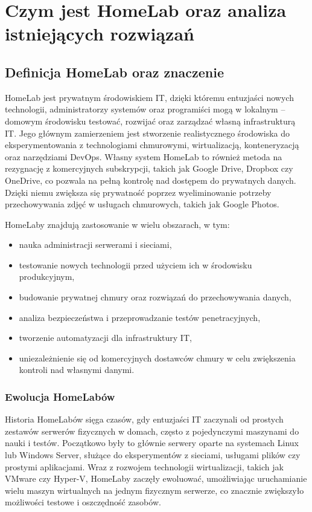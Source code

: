 \chapter{Czym jest HomeLab oraz analiza istniejących rozwiązań}

\section{Definicja HomeLab oraz znaczenie}
HomeLab jest prywatnym środowiskiem IT, dzięki któremu entuzjaści nowych technologii, administratorzy systemów oraz programiści mogą w lokalnym – domowym środowisku testować, rozwijać oraz zarządzać własną infrastrukturą IT. Jego głównym zamierzeniem jest stworzenie realistycznego środowiska do eksperymentowania z technologiami chmurowymi, wirtualizacją, konteneryzacją oraz narzędziami DevOps. Własny system HomeLab to również metoda na rezygnację z komercyjnych subskrypcji, takich jak Google Drive, Dropbox czy OneDrive, co pozwala na pełną kontrolę nad dostępem do prywatnych danych. Dzięki niemu zwiększa się prywatność poprzez wyeliminowanie potrzeby przechowywania zdjęć w usługach chmurowych, takich jak Google Photos.

HomeLaby znajdują zastosowanie w wielu obszarach, w tym:
\begin{itemize}
    \item nauka administracji serwerami i sieciami,
    \item testowanie nowych technologii przed użyciem ich w środowisku produkcyjnym,
    \item budowanie prywatnej chmury oraz rozwiązań do przechowywania danych,
    \item analiza bezpieczeństwa i przeprowadzanie testów penetracyjnych,
    \item tworzenie automatyzacji dla infrastruktury IT,
    \item uniezależnienie się od komercyjnych dostawców chmury w celu zwiększenia kontroli nad własnymi danymi.
\end{itemize}

\subsection{Ewolucja HomeLabów}
Historia HomeLabów sięga czasów, gdy entuzjaści IT zaczynali od prostych zestawów serwerów fizycznych w domach, często z pojedynczymi maszynami do nauki i testów. Początkowo były to głównie serwery oparte na systemach Linux lub Windows Server, służące do eksperymentów z sieciami, usługami plików czy prostymi aplikacjami. Wraz z rozwojem technologii wirtualizacji, takich jak VMware czy Hyper-V, HomeLaby zaczęły ewoluować, umożliwiając uruchamianie wielu maszyn wirtualnych na jednym fizycznym serwerze, co znacznie zwiększyło możliwości testowe i oszczędność zasobów.

